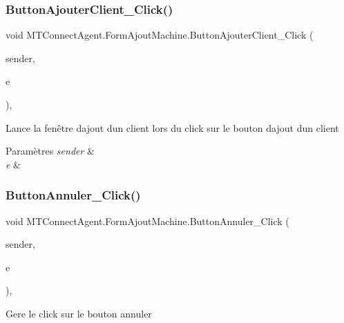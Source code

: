 \subsubsection{\texorpdfstring{Button\+Ajouter\+Client\+\_\+\+Click()}{ButtonAjouterClient\_Click()}}
{\footnotesize\ttfamily void M\+T\+Connect\+Agent.\+Form\+Ajout\+Machine.\+Button\+Ajouter\+Client\+\_\+\+Click (\begin{DoxyParamCaption}\item[{object}]{sender,  }\item[{Event\+Args}]{e }\end{DoxyParamCaption})\hspace{0.3cm}{\ttfamily [inline]}, {\ttfamily [private]}}



Lance la fenêtre d\textquotesingle{}ajout d\textquotesingle{}un client lors du click sur le bouton d\textquotesingle{}ajout d\textquotesingle{}un client 


\begin{DoxyParams}{Paramètres}
{\em sender} & \\
\hline
{\em e} & \\
\hline
\end{DoxyParams}
\mbox{\label{class_m_t_connect_agent_1_1_form_ajout_machine_ae93513d1c019ddeeaaa1f04d8d723bf4}} 
\subsubsection{\texorpdfstring{Button\+Annuler\+\_\+\+Click()}{ButtonAnnuler\_Click()}}
{\footnotesize\ttfamily void M\+T\+Connect\+Agent.\+Form\+Ajout\+Machine.\+Button\+Annuler\+\_\+\+Click (\begin{DoxyParamCaption}\item[{object}]{sender,  }\item[{Event\+Args}]{e }\end{DoxyParamCaption})\hspace{0.3cm}{\ttfamily [inline]}, {\ttfamily [private]}}



Gere le click sur le bouton annuler 


